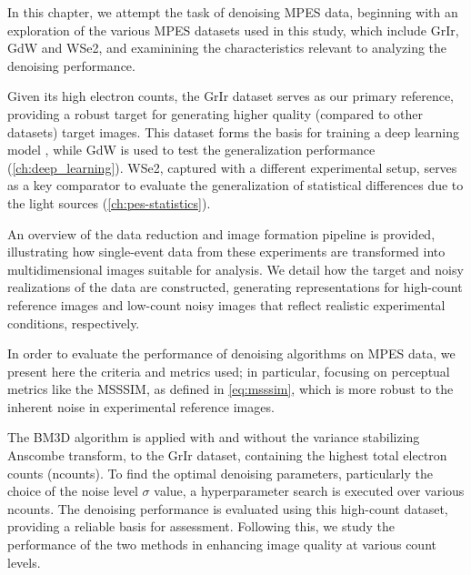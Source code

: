 In this chapter, we attempt the task of denoising \gls{MPES} data, beginning with an exploration of the various \gls{MPES} datasets used in this study, which include \gls{GrIr}, \gls{GdW} and \gls{WSe2}, and examinining the characteristics relevant to analyzing the denoising performance.

Given its high electron counts, the \gls{GrIr} dataset serves as our primary reference, providing a robust target for generating higher quality (compared to other datasets) target images. This dataset forms the basis for training a deep learning model , while \gls{GdW} is used to test the generalization performance (\cref{ch:deep_learning}). \gls{WSe2}, captured with a different experimental setup, serves as a key comparator to evaluate the generalization of statistical differences due to the light sources (\cref{ch:pes-statistics}).

An overview of the data reduction and image formation pipeline is provided, illustrating how single-event data from these experiments are transformed into multidimensional images suitable for analysis. We detail how the target and noisy realizations of the data are constructed, generating representations for high-count reference images and low-count noisy images that reflect realistic experimental conditions, respectively.

In order to evaluate the performance of denoising algorithms on \gls{MPES} data, we present here the criteria and metrics used; in particular, focusing on perceptual metrics like the \gls{MSSSIM}, as defined in \cref{eq:msssim}, which is more robust to the inherent noise in experimental reference images.

The \gls{BM3D} algorithm is applied with and without the variance stabilizing Anscombe transform, to the \gls{GrIr} dataset, containing  the highest total electron counts (\gls{ncounts}). To find the optimal denoising parameters, particularly the choice of the noise level  $\sigma$ value, a hyperparameter search is executed over various \gls{ncounts}. The denoising performance is evaluated using this high-count dataset, providing a reliable basis for assessment. Following this, we study the performance of the two methods in enhancing image quality at various count levels.



